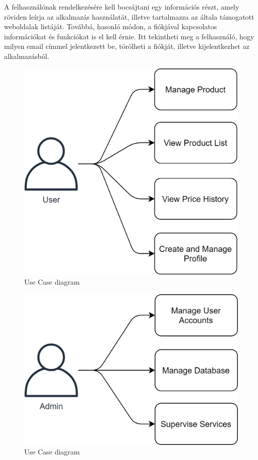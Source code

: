 A felhasználónak rendelkezésére kell bocsájtani egy információs részt, amely röviden leírja az alkalmazás használatát, illetve tartalmazza az általa támogatott weboldalak listáját. Továbbá, hasonló módon, a fiókjával kapcsolatos információkat és funkciókat is el kell érnie. Itt tekintheti meg a felhasználó, hogy milyen email címmel jelentkezett be, törölheti a fiókját, illetve kijelentkezhet az alkalmazásból.

\begin{figure}[H]
    \centering
    \includegraphics[scale=1.2]{figures/images/general_use_case.png}
    \caption{Use Case diagram}
    \label{fig:general_use_case}
\end{figure}

\begin{figure}[H]
    \centering
    \includegraphics[scale=1.2]{figures/images/admin_use_case.png}
    \caption{Use Case diagram}
    \label{fig:admin_use_case}
\end{figure}

